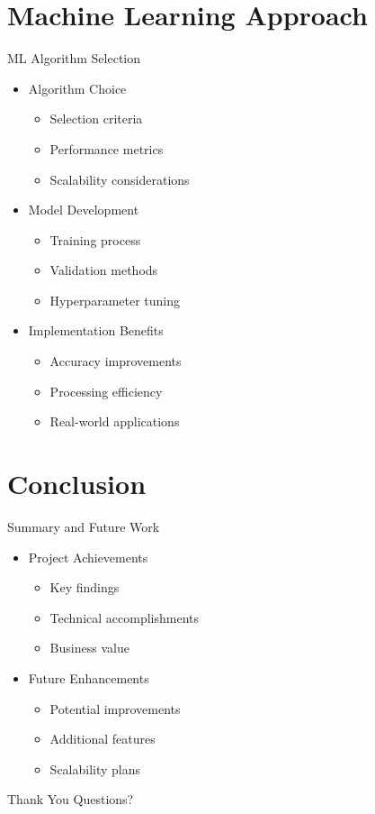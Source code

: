 \documentclass[aspectratio=169]{beamer}
\begin{document}
\section{Machine Learning Approach}
\begin{frame}{ML Algorithm Selection}
    \begin{itemize}
        \item Algorithm Choice
        \begin{itemize}
            \item Selection criteria
            \item Performance metrics
            \item Scalability considerations
        \end{itemize}
        \item Model Development
        \begin{itemize}
            \item Training process
            \item Validation methods
            \item Hyperparameter tuning
        \end{itemize}
        \item Implementation Benefits
        \begin{itemize}
            \item Accuracy improvements
            \item Processing efficiency
            \item Real-world applications
        \end{itemize}
    \end{itemize}
\end{frame}

\section{Conclusion}
\begin{frame}{Summary and Future Work}
    \begin{itemize}
        \item Project Achievements
        \begin{itemize}
            \item Key findings
            \item Technical accomplishments
            \item Business value
        \end{itemize}
        \item Future Enhancements
        \begin{itemize}
            \item Potential improvements
            \item Additional features
            \item Scalability plans
        \end{itemize}
    \end{itemize}
\end{frame}

\begin{frame}{Thank You}
    \centering
    \Large
    Questions?
\end{frame}
\end{document}
